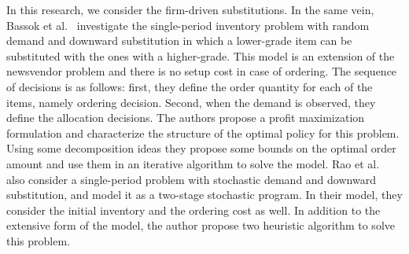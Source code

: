 \documentclass[10pt]{article}
\begin{document}
In this research, we consider the firm-driven substitutions. In the same vein, Bassok et al.~\cite{bassok1999single} investigate the single-period inventory problem with random demand and downward substitution in which a lower-grade item can be substituted with the ones with a higher-grade. This model is an extension of the newsvendor problem and there is no setup cost in case of ordering. The sequence of decisions is as follows: first, they define the order quantity for each of the items, namely ordering decision. Second, when the demand is observed, they define the allocation decisions. The authors propose a profit maximization formulation and characterize the structure of the optimal policy for this problem. Using some decomposition ideas they propose some bounds on the optimal order amount and use them in an iterative algorithm to solve the model.  Rao et al.~\cite{rao2004multi} also consider a single-period problem with stochastic demand and downward substitution, and model it as a two-stage stochastic program. In their model, they consider the initial inventory and the ordering cost as well. In addition to the extensive form of the model, the author propose two heuristic algorithm to solve this problem.
\end{document}
